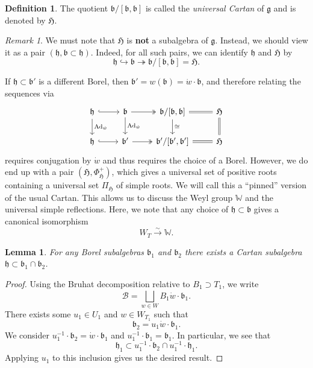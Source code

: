 \documentclass{amsart}
\newtheorem{lem}[thm]{Lemma}
\theoremstyle{definition}
\newtheorem{defn}[thm]{Definition}
\theoremstyle{remark}
\newtheorem{rmk}[thm]{Remark}
\theoremstyle{plain}
\theoremstyle{definition}
\theoremstyle{remark}
\newcommand{\g}{\mathfrak{g}}
\newcommand{\h}{\mathfrak{h}}
\renewcommand{\b}{\mathfrak{b}}
\newcommand{\mc}[1]{\mathcal{#1}}
\newcommand{\mf}[1]{\mathfrak{#1}}
\newcommand{\mbb}[1]{\mathbb{#1}}
\newcommand{\1}{\mathbf{1}}
\newcommand{\2}{\mathbf{2}}
\newcommand{\3}{\mathbf{3}}
\DeclareMathOperator{\Ad}{Ad}
\begin{document}
\begin{defn}
    The quotient \(\b / [\b, \b]\) is called the \textit{universal Cartan} of \(\g\) and is denoted by \(\mf{H}\).
\end{defn}

\begin{rmk}
    We must note that \(\mf{H}\) is \textbf{not} a subalgebra of \(\g\). Instead, we should view it as a pair \((\h, \b \subset \h)\). Indeed, for all such pairs, we can identify \(\h\) and \(\mf{H}\) by
    \[ \h \hookrightarrow \b \twoheadrightarrow \b / [\b, \b] = \mf{H}. \]

    If \(\h \subset \b'\) is a different Borel, then \(\b' = w(\b) = \dot{w} \cdot \b\), and therefore relating the sequences via
    \begin{equation*}
    \begin{tikzcd}
        \h \ar[hookrightarrow]{r} \ar{d}{\Ad_{\dot{w}}} & \b \ar[twoheadrightarrow]{r} \ar{d}{\Ad_{\dot{w}}} & \b / [\b, \b] \ar{d}{\cong} \ar[equals]{r} & \mf{H} \ar[equals]{d} \\
        \h \ar[hookrightarrow]{r} & \b' \ar[twoheadrightarrow]{r} & \b' / [\b', \b'] \ar[equals]{r} & \mf{H}
    \end{tikzcd}
    \end{equation*}
    requires conjugation by \(\dot{w}\) and thus requires the choice of a Borel. However, we do end up with a pair \((\mf{H}, \Phi^+_{\mf{H}})\), which gives a universal set of positive roots containing a universal set \(\Pi_{\mf{H}}\) of simple roots. We will call this a ``pinned'' version of the usual Cartan. This allows us to discuss the Weyl group \(\mbb{W}\) and the universal simple reflections. Here, we note that any choice of \(\h \subset \b\) gives a canonical isomorphism
    \[ W_T \xrightarrow{\sim} \mbb{W}. \]
\end{rmk}

\begin{lem}
    For any Borel subalgebras \(\b_1\) and \(\b_2\) there exists a Cartan subalgebra \(\h \subset \b_1 \cap \b_2\).
\end{lem}

\begin{proof}
    Using the Bruhat decomposition relative to \(B_1 \supset T_1\), we write
    \[ \mc{B} = \bigsqcup_{w \in W} B_1 \dot{w} \cdot \b_1. \]
    There exists some \(u_1 \in U_1\) and \(w \in W_{T_1}\) such that
    \[ \b_2 = u_1 \dot{w} \cdot \b_1. \]
    We consider \(u_1^{-1} \cdot \b_2 = \dot{w} \cdot \b_1\) and \(u_1^{-1} \cdot \b_1 = \b_1\). In particular, we see that
    \[ \h_1 \subset u_1^{-1}  \cdot \b_2 \cap u_1^{-1} \cdot \h_1. \]
    Applying \(u_1\) to this inclusion gives us the desired result.
\end{proof}
\end{document}
